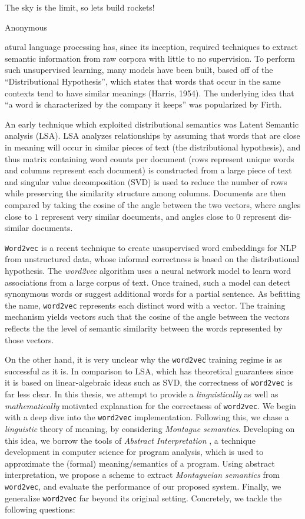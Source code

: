 \documentclass[11pt]{book}
\begin{document}
\epigraph{The sky is the limit, so lets build rockets!}{Anonymous}


atural language processing has, since its inception, required
techniques to extract semantic information from raw corpora with little to no
supervision. To perform such unsupervised learning, many models
have been built, based off of the ``Distributional Hypothesis'', which states
that words that occur in the same contexts tend to have similar meanings
(Harris, 1954). The underlying idea that ``a word is characterized by the
company it keeps'' was popularized by Firth.

An early technique which exploited distributional semantics was Latent Semantic
analysis (LSA)\cite{landauer1998introduction}. LSA analyzes relationships by
assuming that words that are close in meaning will occur in similar pieces of
text (the distributional hypothesis), and thus matrix containing word counts
per document (rows represent unique words and columns represent each document)
is constructed from a large piece of text and  singular value decomposition
(SVD) is used to reduce the number of rows while preserving the similarity
structure among columns. Documents are then compared by taking the cosine of
the angle between the two vectors, where angles close to $1$ represent very
similar documents, and angles close to $0$ represent dis-similar documents.

\texttt{Word2vec} is a recent technique to create unsupervised word embeddings
for NLP from unstructured data, whose informal correctness is based on the
distributional hypothesis. The \emph{word2vec} algorithm uses a neural network
model to learn word associations from a large corpus of text. Once trained,
such a model can detect synonymous words or suggest additional words for a
partial sentence.  As befitting the name, \texttt{word2vec} represents each
distinct word with a vector. The training mechanism yields vectors such that
the cosine of the angle between the vectors reflects the the level of semantic
similarity between the words represented by those vectors.

On the other hand, it is very unclear why the \texttt{word2vec} training regime
is as successful as it is. In comparison to LSA, which has theoretical guarantees
since it is based on linear-algebraic ideas such as SVD, the correctness of
\texttt{word2vec} is far less clear. In this thesis, we attempt to provide a
\emph{linguistically} as well as \emph{mathematically} motivated explanation
for the correctness of \texttt{word2vec}. We begin with a deep dive into the \texttt{word2vec}
implementation. Following this, we chase a \emph{linguistic} theory of meaning,
by considering \emph{Montague semantics}. Developing on this idea, we borrow the tools of
\emph{Abstract Interpretation} \cite{cousout1996abstract}, a technique development in computer science for
program analysis, which is used to approximate the (formal) meaning/semantics
of a program. Using abstract interpretation, we propose a scheme to extract
\emph{Montagueian semantics} from \texttt{word2vec}, and evaluate the
performance of our proposed system. Finally, we generalize \texttt{word2vec}
far beyond its original setting. Concretely, we tackle the following questions:
\end{document}
